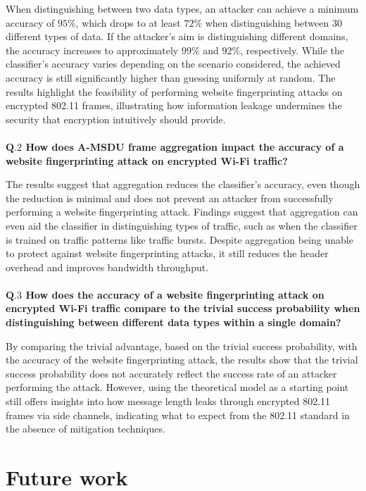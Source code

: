 When distinguishing between two data types, an attacker can achieve a minimum accuracy of $95\%$, which drops to at least $72\%$ when distinguishing between $30$ different types of data. If the attacker's aim is distinguishing different domains, the accuracy increases to approximately $99\%$ and $92\%$, respectively. While the classifier's accuracy varies depending on the scenario considered, the achieved accuracy is still significantly higher than guessing uniformly at random. The results highlight the feasibility of performing website fingerprinting attacks on encrypted 802.11 frames, illustrating how information leakage undermines the security that encryption intuitively should provide.
\\
\\
\textbf{$\mathbf{Q.2}$ How does A-MSDU frame aggregation impact the accuracy of a website fingerprinting attack on encrypted Wi-Fi traffic?}

The results suggest that aggregation reduces the classifier's accuracy, even though the reduction is minimal and does not prevent an attacker from successfully performing a website fingerprinting attack. Findings suggest that aggregation can even aid the classifier in distinguishing types of traffic, such as when the classifier is trained on traffic patterns like traffic bursts. Despite aggregation being unable to protect against website fingerprinting attacks, it still reduces the header overhead and improves bandwidth throughput.
\\
\\
\textbf{$\mathbf{Q.3}$ How does the accuracy of a website fingerprinting attack on encrypted Wi-Fi traffic compare to the trivial success probability when distinguishing between different data types within a single domain?}
  
By comparing the trivial advantage, based on the trivial success probability, with the accuracy of the website fingerprinting attack, the results show that the trivial success probability does not accurately reflect the success rate of an attacker performing the attack. However, using the theoretical model as a starting point still offers insights into how message length leaks through encrypted 802.11 frames via side channels, indicating what to expect from the 802.11 standard in the absence of mitigation techniques.

\section{Future work\label{sec:future-conclusion}}

